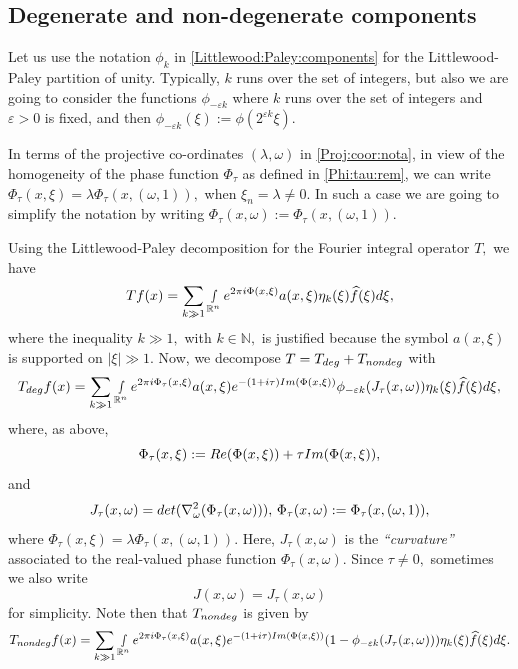 \documentclass[12pt, reqno]{amsart}
\theoremstyle{definition}
\theoremstyle{remark}
\numberwithin{equation}{section}
\begin{document}
\subsection{Degenerate and non-degenerate components}\label{Degenerate:non:degenerate:components}
Let us use the notation $\phi_{k}$ in \eqref{Littlewood:Paley:components} for the Littlewood-Paley partition of unity. Typically, $k$ runs over the set of integers, but also we are going to consider the functions $\phi_{-\varepsilon k}$ where $k$ runs over the set of integers and $\varepsilon>0$ is fixed, and then $ \phi_{-\varepsilon k}(\xi):=\phi(2^{\varepsilon k}\xi).$


In terms of the projective co-ordinates $(\lambda,\omega)$ in \eqref{Proj:coor:nota}, in view of the homogeneity of the phase function $\Phi_{\tau}$ as defined in \eqref{Phi:tau:rem}, we can write $\Phi_\tau(x,\xi)=\lambda\Phi_\tau(x,(\omega,1)),$ when $\xi_n=\lambda\neq 0.$ In such a case we are going to simplify the notation by writing $\Phi_\tau(x,\omega):=\Phi_\tau(x,(\omega,1)).$


Using the Littlewood-Paley decomposition for the Fourier integral operator $T,$ we have
\begin{equation*}
    Tf(x)=\sum_{k\gg 1}\smallint\limits_{\mathbb{R}^n}e^{2\pi i\Phi(x,\xi)}a(x,\xi)\eta_{k}(\xi)\widehat{f}(\xi)d\xi,
\end{equation*}where the inequality $k\gg 1,$ with $k\in \mathbb{N},$ is justified because the symbol $a(x,\xi)$ is supported on $|\xi|\gg 1.$ Now, we decompose $T=T_{\textnormal{deg}}+T_{\textnormal{nondeg}}$ with
\begin{equation*}
    T_{\textnormal{deg}} f(x)= \sum_{k\gg 1}\smallint\limits_{\mathbb{R}^n}e^{2\pi i\Phi_\tau(x,\xi)}a(x,\xi)e^{-(1+i\tau)\textnormal{Im}(\Phi(x,\xi))}\phi_{-\varepsilon k}(J_{\tau}(x,\omega))\eta_{k}(\xi)\widehat{f}(\xi)d\xi,
\end{equation*} where, as above,
\begin{equation}
    \Phi_{\tau}(x,\xi):=\textnormal{Re}(\Phi(x,\xi))+\tau\textnormal{Im}(\Phi(x,\xi)),
\end{equation} and 
\begin{equation}
    J_{\tau}(x,\omega)=\textnormal{det}(\nabla_{\omega}^2(\Phi_\tau(x,\omega))),\, \Phi_\tau(x,\omega):=\Phi_{\tau}(x,(\omega,1)),
\end{equation} where $\Phi_{\tau}(x,\xi)=\lambda\Phi_{\tau}(x,(\omega,1)).$ Here, $J_{\tau}(x,\omega)$ is the {\it ``curvature''} associated to the real-valued phase function $\Phi_{\tau}(x,\omega).$ Since $\tau\neq 0,$ sometimes we also write
$$J(x,\omega)=J_{\tau}(x,\omega)$$ for simplicity.
Note then that $T_{\textnormal{nondeg}}$ is given  by
\begin{equation}\label{non:de:c}
    T_{\textnormal{nondeg}} f(x)= \sum_{k\gg 1}\smallint\limits_{\mathbb{R}^n}e^{2\pi i\Phi_\tau(x,\xi)}a(x,\xi)e^{-(1+i\tau)\textnormal{Im}(\Phi(x,\xi))}(1-\phi_{-\varepsilon k}(J_{\tau}(x,\omega)))\eta_{k}(\xi)\widehat{f}(\xi)d\xi.
\end{equation}
\end{document}
